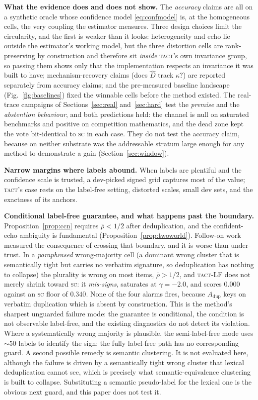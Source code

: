 \documentclass[conference]{IEEEtran}
\newcommand{\Dhat}{\widehat{D}}
\newcommand{\SC}{\textsc{sc}}
\newcommand{\TACT}{\textsc{tact}}
\begin{document}
\textbf{What the evidence does and does not show.} The \emph{accuracy} claims are all on a synthetic oracle whose confidence model \eqref{eq:confmodel} is, at the homogeneous cells, the very coupling the estimator measures. Three design choices limit the circularity, and the first is weaker than it
looks: heterogeneity and echo lie outside the estimator's working model, but
the three distortion cells are rank-preserving by construction and therefore
sit \emph{inside} \TACT's own invariance group, so passing them shows only that the
implementation respects an invariance it was built to have; mechanism-recovery claims (does $\Dhat$ track $\kappa$?) are reported separately from accuracy claims; and the pre-measured baseline landscape (Fig.~\ref{fig:baselines}) fixed the winnable cells before the method existed. The real-trace campaigns of Sections~\ref{sec:real} and~\ref{sec:hard} test the \emph{premise} and the \emph{abstention behaviour}, and both predictions held: the channel is null on saturated benchmarks and positive on competition mathematics, and the dead zone kept the vote bit-identical to \SC{} in each case. They do not test the accuracy claim, because on neither substrate was the addressable stratum large enough for any method to demonstrate a gain (Section~\ref{sec:window}).

\textbf{Narrow margins where labels abound.} When labels are plentiful and the confidence scale is trusted, a dev-picked signed grid captures most of the value; \TACT's case rests on the label-free setting, distorted scales, small dev sets, and the exactness of its anchors.

\textbf{Conditional label-free guarantee, and what happens past the boundary.}
Proposition~\ref{prop:ccn} requires $\bar\rho<1/2$ after deduplication, and the
confident-echo ambiguity is fundamental (Proposition~\ref{prop:twoworld}).
Follow-on work measured the consequence of crossing that boundary, and it is
worse than under-trust. In a \emph{paraphrased} wrong-majority cell (a dominant
wrong cluster that is semantically tight but carries no verbatim signature, so
deduplication has nothing to collapse) the plurality is wrong on most items,
$\bar\rho>1/2$, and \TACT-LF does not merely shrink toward \SC: it
\emph{mis-signs}, saturates at $\gamma=-2.0$, and scores $0.000$ against an
\SC{} floor of $0.340$. None of the four alarms fires, because $A_{\mathrm{dup}}$ keys on
verbatim duplication which is absent by construction. This is the method's
sharpest unguarded failure mode: the guarantee is conditional, the condition is
not observable label-free, and the existing diagnostics do not detect its
violation. Where a systematically wrong majority is plausible, the
semi-label-free mode uses ${\sim}50$ labels to identify the sign; the fully
label-free path has no corresponding guard. A second possible remedy is semantic
clustering. It is not evaluated here, although the failure is driven by a semantically tight wrong cluster that
lexical deduplication cannot see, which is precisely what semantic-equivalence
clustering \cite{kuhn2023semantic} is built to collapse. Substituting a
semantic pseudo-label for the lexical one is the obvious next guard, and this
paper does not test it.
\end{document}

